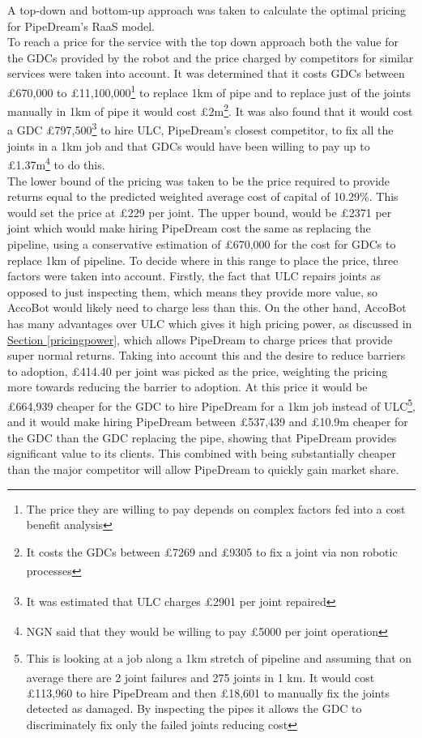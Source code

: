 \documentclass[11pt]{article}		%
\newcommand{\supercite}[1]{\textsuperscript{\cite{#1}}}		%
\newcommand{\sectref}[1]{\hyperref[#1]{Section \ref*{#1}}}     %
\begin{document}
                A top-down and bottom-up approach was taken to calculate the optimal pricing for PipeDream's RaaS model.
                 \\
            \hspace*{2ex}
                To reach a price for the service with the top down approach both the value for the GDCs provided by the robot and the price charged by competitors for similar services were taken into account. 
                It was determined that it costs GDCs between £670,000 to £11,100,000\footnote{The price they are willing to pay depends on complex factors fed into a cost benefit analysis} to replace 1km of pipe\supercite{SGN_Scotland} and to replace just of the joints manually in 1km of pipe it would cost £2m\footnote{It costs the GDCs between £7269 and £9305 to fix a joint via non robotic processes\supercite{NYT}}.
	            It was also found that it would cost a GDC £797,500\footnote{It was estimated that ULC charges £2901 per joint repaired\supercite{NYT}} to hire ULC\supercite{NYT}, PipeDream's closest competitor, to fix all the joints in a 1km job and that GDCs would have been willing to pay up to £1.37m\footnote{NGN said that they would be willing to pay £5000 per joint operation\supercite{NGN}} to do this.
	            \\
            \hspace*{2ex}
                The lower bound of the pricing was taken to be the price required to provide returns equal to the predicted weighted average cost of capital of 10.29\%.  This would set the price at £229 per joint. The upper bound, would be £2371 per joint which would make hiring PipeDream cost the same as replacing the pipeline, using a conservative estimation of £670,000 for the cost for GDCs to replace 1km of pipeline. To decide where in this range to place the price, three factors were taken into account. Firstly, the fact that ULC repairs joints as opposed to just inspecting them, which means they provide more value, so AccoBot would likely need to charge less than this. On the other hand, AccoBot has many advantages over ULC which gives it high pricing power, as discussed in \sectref{pricingpower}, which allows PipeDream to charge prices that provide super normal returns. Taking into account this and the desire to reduce barriers to adoption, £414.40 per joint was picked as the price, weighting the pricing more towards reducing the barrier to adoption. At this price it would be £664,939 cheaper for the GDC to hire PipeDream for a 1km job instead of ULC\footnote{This is looking at a job along a 1km stretch of pipeline and assuming that on average there are 2 joint failures and 275 joints in 1 km\supercite{SGN_Southern}. It would cost £113,960 to hire PipeDream and then £18,601 to manually fix the joints detected as damaged. By inspecting the pipes it allows the GDC to discriminately fix only the failed joints reducing cost}, and it would make hiring PipeDream between £537,439 and £10.9m cheaper for the GDC than the GDC  replacing the pipe, showing that PipeDream provides significant value to its clients. This combined with being substantially cheaper than the major competitor will allow PipeDream to quickly gain market share.
\end{document}
